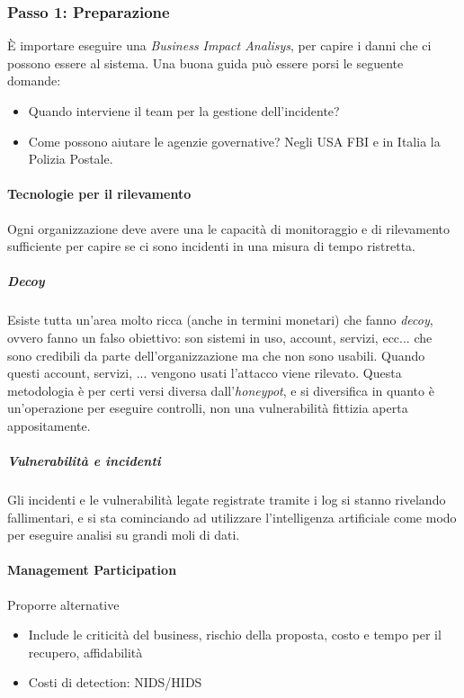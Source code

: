 \subsubsection{Passo 1: Preparazione}

È importare eseguire una \textit{Business Impact Analisys}, per capire i danni 
che ci possono essere al sistema.
Una buona guida può essere porsi le seguente domande:
\begin{itemize}
\item Quando interviene il team per la gestione dell'incidente?
\item Come possono aiutare le agenzie governative? Negli USA FBI e in Italia la 
Polizia Postale.
\end{itemize}



\paragraph*{Tecnologie per il rilevamento}

Ogni organizzazione deve avere una le capacità di monitoraggio e di rilevamento 
sufficiente per capire se ci sono incidenti in una misura di tempo ristretta.

\subparagraph*{Decoy} Esiste tutta un'area molto ricca (anche in termini 
monetari) che fanno \textit{decoy}, ovvero fanno un falso obiettivo: son sistemi 
in uso, account, servizi, ecc... che sono credibili da parte dell'organizzazione 
ma che non sono usabili. Quando questi account, servizi, ... vengono usati 
l'attacco viene rilevato. Questa metodologia è per certi versi diversa 
dall'\textit{honeypot}, e si diversifica in quanto è un'operazione per eseguire 
controlli, non una vulnerabilità fittizia aperta appositamente.

\subparagraph*{Vulnerabilità e incidenti} Gli incidenti e le vulnerabilità 
legate registrate tramite i log si stanno rivelando fallimentari, e si sta 
cominciando ad utilizzare l'intelligenza artificiale come modo per eseguire 
analisi su grandi moli di dati.

\paragraph*{Management Participation}

Proporre alternative
\begin{itemize}
\item Include le criticità del business, rischio della proposta, costo e tempo 
per il recupero, affidabilità
\item Costi di detection: NIDS/HIDS
\end{itemize}

